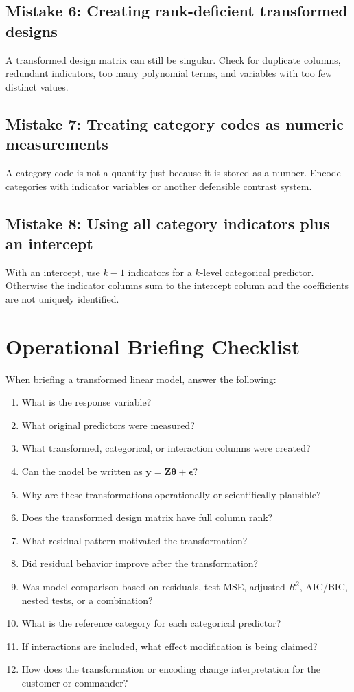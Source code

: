 {\subsection*{Mistake 6: Creating rank-deficient transformed designs}

A transformed design matrix can still be singular.  Check for duplicate columns, redundant indicators, too many polynomial terms, and variables with too few distinct values.

\subsection*{Mistake 7: Treating category codes as numeric measurements}

A category code is not a quantity just because it is stored as a number.  Encode categories with indicator variables or another defensible contrast system.

\subsection*{Mistake 8: Using all category indicators plus an intercept}

With an intercept, use \(k-1\) indicators for a \(k\)-level categorical predictor.  Otherwise the indicator columns sum to the intercept column and the coefficients are not uniquely identified.

\section{Operational Briefing Checklist}

When briefing a transformed linear model, answer the following:
\begin{enumerate}
  \item What is the response variable?
  \item What original predictors were measured?
  \item What transformed, categorical, or interaction columns were created?
  \item Can the model be written as \(\mathbf{y}=\mathbf{Z}\boldsymbol{\theta}+\boldsymbol{\epsilon}\)?
  \item Why are these transformations operationally or scientifically plausible?
  \item Does the transformed design matrix have full column rank?
  \item What residual pattern motivated the transformation?
  \item Did residual behavior improve after the transformation?
  \item Was model comparison based on residuals, test MSE, adjusted \(R^2\), AIC/BIC, nested tests, or a combination?
  \item What is the reference category for each categorical predictor?
  \item If interactions are included, what effect modification is being claimed?
  \item How does the transformation or encoding change interpretation for the customer or commander?
\end{enumerate}

}
